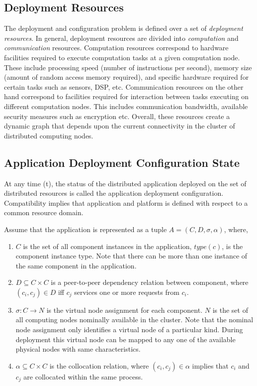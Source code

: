 \subsection{Deployment Resources}
The deployment and configuration problem is defined over a set of
\emph{deployment resources}. In general, deployment resources are
divided into \emph{computation} and \emph{communication}
resources. Computation resources correspond to hardware facilities
required to execute computation tasks at a given computation
node. These include processing speed (number of instructions per
second), memory size (amount of random access memory required), and
specific hardware required for certain tasks such as sensors, DSP,
etc.  Communication resources on the other hand correspond to
facilities required for interaction between tasks executing on
different computation nodes. This includes communication bandwidth,
available security measures such as encryption etc. Overall, these
resources create a dynamic graph that depends upon the current
connectivity in the cluster of distributed computing nodes.

\subsection{Application Deployment Configuration State}
At any time (t), the status of the distributed application deployed on
the set of distributed resources is called the application deployment
configuration. Compatibility implies that application and platform is
defined with respect to a common resource domain.

Assume that the application is represented as a tuple $A=(C, D,
\sigma, \alpha)$, where,
\begin{enumerate}
\item $C$ is the set of all component instances in the
    application, $type(c)$, is the component instance type. Note that
    there can be more than one instance of the same component in the
    application.
\item $D \subseteq C \times C$ is a peer-to-peer dependency relation
between component, where $(c_i,c_j)\in D$ iff $c_j$ services one or
more requests from $c_i$.
\item $\sigma: C \rightarrow N$ is the virtual node assignment for
each component. $N$ is the set of all computing nodes nominally
available in the cluster. Note that the nominal node assignment only
identifies a virtual node of a particular kind. During deployment this
virtual node can be mapped to any one of the available physical nodes
with same characteristics.
\item $\alpha \subseteq C \times C$ is the collocation relation, where
$(c_i,c_j)\in \alpha$ implies that $c_i$ and $c_j$ are collocated
within the same process.
\end{enumerate}

